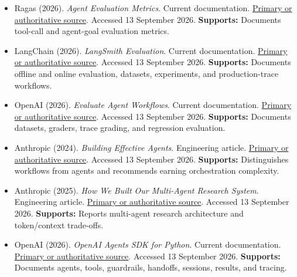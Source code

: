 \begin{itemize}
\item {}\textbf{} Ragas (2026). \emph{Agent Evaluation Metrics}. Current documentation. \href{\detokenize{https://docs.ragas.io/en/latest/concepts/metrics/available_metrics/agents}}{Primary or authoritative source}. Accessed 13 September 2026. \textbf{Supports:} Documents tool-call and agent-goal evaluation metrics.

\item {}\textbf{} LangChain (2026). \emph{LangSmith Evaluation}. Current documentation. \href{\detokenize{https://docs.langchain.com/langsmith/evaluation}}{Primary or authoritative source}. Accessed 13 September 2026. \textbf{Supports:} Documents offline and online evaluation, datasets, experiments, and production-trace workflows.

\item {}\textbf{} OpenAI (2026). \emph{Evaluate Agent Workflows}. Current documentation. \href{\detokenize{https://developers.openai.com/api/docs/guides/agent-evals}}{Primary or authoritative source}. Accessed 13 September 2026. \textbf{Supports:} Documents datasets, graders, trace grading, and regression evaluation.

\item {}\textbf{} Anthropic (2024). \emph{Building Effective Agents}. Engineering article. \href{\detokenize{https://www.anthropic.com/engineering/building-effective-agents}}{Primary or authoritative source}. Accessed 13 September 2026. \textbf{Supports:} Distinguishes workflows from agents and recommends earning orchestration complexity.

\item {}\textbf{} Anthropic (2025). \emph{How We Built Our Multi-Agent Research System}. Engineering article. \href{\detokenize{https://www.anthropic.com/engineering/multi-agent-research-system}}{Primary or authoritative source}. Accessed 13 September 2026. \textbf{Supports:} Reports multi-agent research architecture and token/context trade-offs.

\item {}\textbf{} OpenAI (2026). \emph{OpenAI Agents SDK for Python}. Current documentation. \href{\detokenize{https://openai.github.io/openai-agents-python}}{Primary or authoritative source}. Accessed 13 September 2026. \textbf{Supports:} Documents agents, tools, guardrails, handoffs, sessions, results, and tracing.


\end{itemize}

